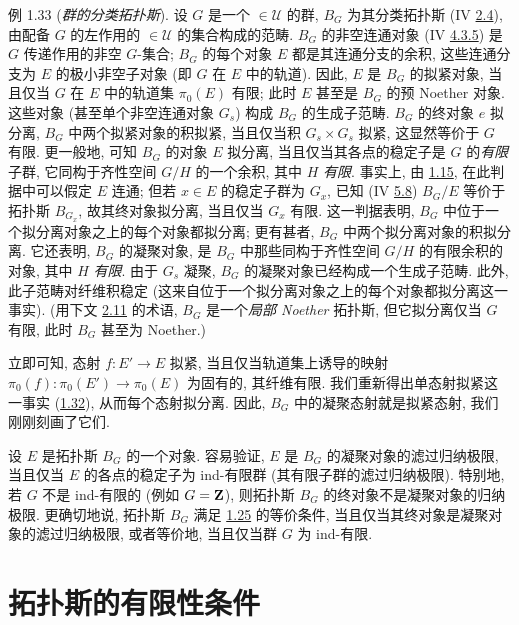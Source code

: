 \begin{enonce*}[remark]{例 1.33}
(\emph{群的分类拓扑斯}).
设 $G$ 是一个 $\in 𝒰$ 的群,
$B_G$ 为其分类拓扑斯 (IV \hyperref[IV.subsec2.4]{2.4}),
\ie 由配备 $G$ 的左作用的 $\in 𝒰$ 的集合构成的范畴.
$B_G$ 的非空连通对象
(IV \hyperref[IV.subsubsec4.3.5]{4.3.5})
是 $G$ 传递作用的非空 $G$-集合;
$B_G$ 的每个对象 $E$ 都是其连通分支的余积,
这些连通分支为 $E$ 的极小非空子对象
(即 $G$ 在 $E$ 中的轨道).
因此, $E$ 是 $B_G$ 的拟紧对象,
当且仅当 $G$ 在 $E$ 中的轨道集 $\pi_0(E)$ 有限;
此时 $E$ 甚至是 $B_G$ 的预 Noether 对象.
这些对象 (甚至单个非空连通对象 $G_s$)
构成 $B_G$ 的生成子范畴.
$B_G$ 的终对象 $e$ 拟分离,
\ie $B_G$ 中两个拟紧对象的积拟紧,
当且仅当积 $G_s\times G_s$ 拟紧,
这显然等价于 $G$ 有限.
更一般地, 可知 $B_G$ 的对象 $E$ 拟分离,
当且仅当其各点的稳定子是 $G$ 的\emph{有限}子群,
\ie 它同构于齐性空间 $G/H$ 的一个余积,
其中 $H$ \emph{有限}.
事实上, 由 \hyperref[VI.cor1.15]{1.15},
在此判据中可以假定 $E$ 连通;
但若 $x\in E$ 的稳定子群为 $G_x$,
已知 (IV \hyperref[IV.subsec5.8]{5.8})\pageoriginale{}
$B_G/E$ 等价于拓扑斯 $B_{G_x}$,
故其终对象拟分离, 当且仅当 $G_x$ 有限.
这一判据表明,
$B_G$ 中位于一个拟分离对象之上的每个对象都拟分离;
更有甚者, $B_G$ 中两个拟分离对象的积拟分离.
它还表明, $B_G$ 的凝聚对象,
是 $B_G$ 中那些同构于齐性空间 $G/H$ 的有限余积的对象,
其中 $H$ \emph{有限}.
由于 $G_s$ 凝聚, $B_G$ 的凝聚对象已经构成一个生成子范畴.
此外, 此子范畴对纤维积稳定
(这来自位于一个拟分离对象之上的每个对象都拟分离这一事实).
(用下文 \hyperref[VI.def2.11]{2.11} 的术语,
$B_G$ 是一个\emph{局部 Noether} 拓扑斯,
但它拟分离仅当 $G$ 有限,
此时 $B_G$ 甚至为 Noether.)

立即可知, 态射 $f:E'\to E$ 拟紧,
当且仅当轨道集上诱导的映射
$\pi_0(f):\pi_0(E')\to\pi_0(E)$ 为固有的,
\ie 其纤维有限.
我们重新得出单态射拟紧这一事实
(\hyperref[VI.subsec1.32]{1.32}),
从而每个态射拟分离.
因此, $B_G$ 中的凝聚态射就是拟紧态射,
我们刚刚刻画了它们.

设 $E$ 是拓扑斯 $B_G$ 的一个对象.
容易验证, $E$ 是 $B_G$ 的凝聚对象的滤过归纳极限,
当且仅当 $E$ 的各点的稳定子为 ind-有限群
(\ie 其有限子群的滤过\pageoriginale{}归纳极限).
特别地, 若 $G$ 不是 ind-有限的 (例如 $G=\mathbf{Z}$),
则拓扑斯 $B_G$ 的终对象不是凝聚对象的归纳极限.
更确切地说, 拓扑斯 $B_G$ 满足 \hyperref[VI.cor1.25]{1.25} 的等价条件,
当且仅当其终对象是凝聚对象的滤过归纳极限,
或者等价地, 当且仅当群 $G$ 为 ind-有限.
\end{enonce*}


\section{拓扑斯的有限性条件}

